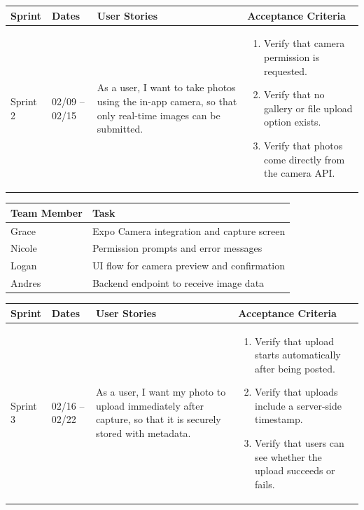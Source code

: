 \documentclass[12pt]{article}
\begin{document}
\noindent
\begin{tabular}{|L{1.2cm}|L{1.8cm}|L{5.2cm}|L{6.3cm}|}
\hline
\textbf{Sprint} & \textbf{Dates} & \textbf{User Stories} & \textbf{Acceptance Criteria} \\
\hline
Sprint 2 & 02/09 -- 02/15 &
As a user, I want to take photos using the in-app camera, so that only real-time images can be submitted. &
\begin{enumerate}
    \item Verify that camera permission is requested.
    \item Verify that no gallery or file upload option exists.
    \item Verify that photos come directly from the camera API.
\end{enumerate} \\
\hline
\end{tabular}

\vspace{0.5em}

\noindent
\begin{tabular}{|L{2.5cm}|L{12.5cm}|}
\hline
\textbf{Team Member} & \textbf{Task} \\
\hline
Grace & Expo Camera integration and capture screen \\
\hline
Nicole & Permission prompts and error messages \\
\hline
Logan & UI flow for camera preview and confirmation \\
\hline
Andres & Backend endpoint to receive image data \\
\hline
\end{tabular}

\vspace{2em}


\vspace{0.5em}

\noindent
\begin{tabular}{|L{1.2cm}|L{1.8cm}|L{5.2cm}|L{6.3cm}|}
\hline
\textbf{Sprint} & \textbf{Dates} & \textbf{User Stories} & \textbf{Acceptance Criteria} \\
\hline
Sprint 3 & 02/16 -- 02/22 &
As a user, I want my photo to upload immediately after capture, so that it is securely stored with metadata. &
\begin{enumerate}
    \item Verify that upload starts automatically after being posted.
    \item Verify that uploads include a server-side timestamp.
    \item Verify that users can see whether the upload succeeds or fails.
\end{enumerate} \\
\hline
\end{tabular}
\end{document}
